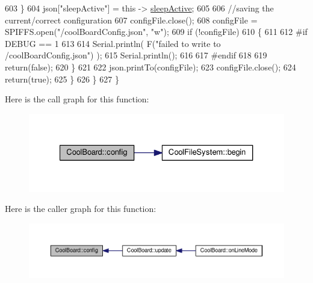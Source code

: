 \begin{DoxyCode}
603             \}
604             json[\textcolor{stringliteral}{"sleepActive"}] = \textcolor{keyword}{this} -> \hyperlink{classCoolBoard_a0a51b2287139f66c738101fb53139230}{sleepActive};
605 
606             \textcolor{comment}{//saving the current/correct configuration}
607             configFile.close();
608             configFile = SPIFFS.open(\textcolor{stringliteral}{"/coolBoardConfig.json"}, \textcolor{stringliteral}{"w"});
609             \textcolor{keywordflow}{if} (!configFile)
610             \{
611             
612 \textcolor{preprocessor}{            #if DEBUG == 1}
613 
614                 Serial.println( F(\textcolor{stringliteral}{"failed to write to /coolBoardConfig.json"}) );
615                 Serial.println();
616             
617 \textcolor{preprocessor}{            #endif}
618  
619                 \textcolor{keywordflow}{return}(\textcolor{keyword}{false});
620             \}
621 
622             json.printTo(configFile);
623             configFile.close();
624             \textcolor{keywordflow}{return}(\textcolor{keyword}{true});
625         \}
626     \}
627 \}
\end{DoxyCode}
Here is the call graph for this function\+:
\nopagebreak
\begin{figure}[H]
\begin{center}
\leavevmode
\includegraphics[width=327pt]{classCoolBoard_a583a874c09c07e70a6eb9229fc4beddb_cgraph}
\end{center}
\end{figure}
Here is the caller graph for this function\+:
\nopagebreak
\begin{figure}[H]
\begin{center}
\leavevmode
\includegraphics[width=350pt]{classCoolBoard_a583a874c09c07e70a6eb9229fc4beddb_icgraph}
\end{center}
\end{figure}
\mbox{\label{classCoolBoard_a519de78b807f8ec6463ff484eb925918}} 
